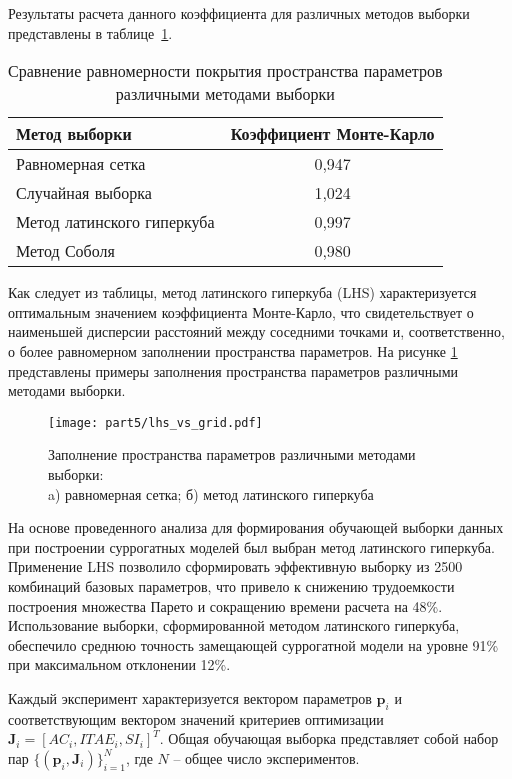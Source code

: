 Результаты расчета данного коэффициента для различных методов выборки представлены в таблице~\ref{tab:monte_carlo_coefficient}.

\begin{table}[ht]
	\centering
	\caption{Сравнение равномерности покрытия пространства параметров различными методами выборки}
	\label{tab:monte_carlo_coefficient}
    \small
	\begin{tabular}{lc}
		\midrule
		\textbf{Метод выборки}     & \textbf{Коэффициент Монте-Карло} \\
		\midrule
		Равномерная сетка          & 0,947                            \\
		Случайная выборка          & 1,024                            \\
		Метод латинского гиперкуба & 0,997                            \\
		Метод Соболя               & 0,980                            \\
		\midrule
	\end{tabular}
\end{table}

Как следует из таблицы, метод латинского гиперкуба (LHS) характеризуется
оптимальным значением коэффициента Монте-Карло,
что свидетельствует о наименьшей дисперсии расстояний между соседними точками и, соответственно,
о более равномерном заполнении пространства параметров. На рисунке \ref{fig:fill_field} представлены
примеры заполнения пространства параметров различными методами выборки.

\begin{figure}[ht]
	\centering
	\texttt{[image: part5/lhs\_vs\_grid.pdf]}
	\caption{Заполнение пространства параметров различными методами выборки:\\
		a) равномерная сетка; б) метод латинского гиперкуба}
	\label{fig:fill_field}
\end{figure}

На основе проведенного анализа для формирования обучающей выборки данных при построении
суррогатных моделей был выбран метод латинского гиперкуба. 
Применение LHS позволило сформировать эффективную выборку из 2500 комбинаций базовых параметров, что
привело к снижению трудоемкости построения множества Парето и сокращению времени расчета на 48\%.
Использование выборки, сформированной методом латинского гиперкуба, обеспечило среднюю точность
замещающей суррогатной модели на уровне 91\% при максимальном отклонении 12\%.

Каждый эксперимент характеризуется вектором параметров $\mathbf{p}_i$ и соответствующим вектором
значений критериев оптимизации $\mathbf{J}_i = [AC_i, ITAE_i, SI_i]^T$. Общая обучающая выборка
представляет собой набор пар $\{(\mathbf{p}_i, \mathbf{J}_i)\}_{i=1}^N$, где $N$ -- общее число экспериментов.

